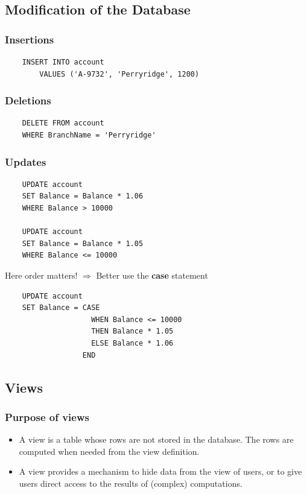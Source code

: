 \subsection{Modification of the Database}

\subsubsection{Insertions}
\begin{lstlisting}
    INSERT INTO account
        VALUES ('A-9732', 'Perryridge', 1200)
\end{lstlisting}

\subsubsection{Deletions}
\begin{lstlisting}
    DELETE FROM account
    WHERE BranchName = 'Perryridge'
\end{lstlisting}
\subsubsection{Updates}
\begin{lstlisting}
    UPDATE account
    SET Balance = Balance * 1.06
    WHERE Balance > 10000

    UPDATE account 
    SET Balance = Balance * 1.05
    WHERE Balance <= 10000
\end{lstlisting}
Here order matters! $\Rightarrow$ Better use the \textbf{case} statement 
\begin{lstlisting}
    UPDATE account
    SET Balance = CASE 
                    WHEN Balance <= 10000
                    THEN Balance * 1.05
                    ELSE Balance * 1.06
                  END
\end{lstlisting}   

\subsection{Views}


\subsubsection{Purpose of views}

\begin{itemize}
    \item A view is a table whose rows are not stored in the database. The rows are computed when needed from the view definition.
    \item A view provides a mechanism to hide data from the view of users, or to give users direct access to the results of (complex) computations.
\end{itemize}
